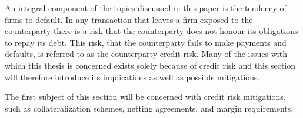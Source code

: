\documentclass[main.tex]{subfiles}
\begin{document}
    An integral component of the topics discussed in this paper is the tendency of firms to default.
    In any transaction that leaves a firm exposed to the counterparty
    there is a risk that the counterparty does not honour its obligations to repay its debt.
    This risk, that the counterparty fails to make payments and defaults, 
    is referred to as the counterparty credit risk.
    Many of the issues with which this thesis is concerned exists solely because of credit risk 
    and this section will therefore introduce its implications as well as possible mitigations.

    The first subject of this section will be concerned with credit risk mitigations,
    such as collateralization schemes, netting agreements, and margin requirements.
\end{document}
